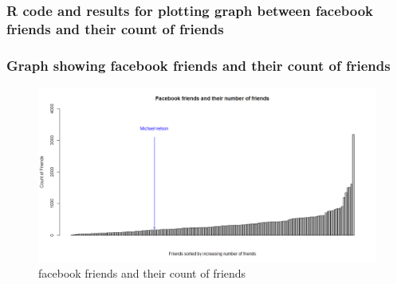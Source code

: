 \subsubsection{R code and results for plotting graph between facebook friends and their count of friends}

\newpage
\subsubsection{Graph showing facebook friends and their count of friends}
\begin{figure}[ht]    
    \begin{center}
        \includegraphics[scale=0.4]{facebookfriendsgraph.png}
        \caption{facebook friends and their count of friends}
        \label{graph1}
    \end{center}
\end{figure}
\newpage